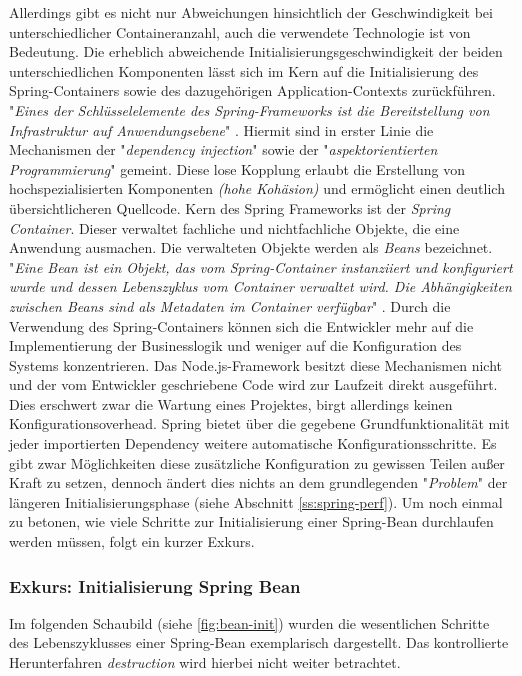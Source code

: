 Allerdings gibt es nicht nur Abweichungen hinsichtlich der Geschwindigkeit bei unterschiedlicher Containeranzahl, auch die verwendete Technologie ist von Bedeutung. Die erheblich abweichende Initialisierungsgeschwindigkeit der beiden unterschiedlichen Komponenten lässt sich im Kern auf die Initialisierung des Spring-Containers sowie des dazugehörigen Application-Contexts zurückführen. "\emph{Eines der Schlüsselelemente des Spring-Frameworks ist die Bereitstellung von Infrastruktur auf Anwendungsebene}" \cite[Seite~53 ff.]{simons-spring}. Hiermit sind in erster Linie die Mechanismen der "\emph{dependency injection}" sowie der "\emph{aspektorientierten Programmierung}" gemeint. Diese lose Kopplung erlaubt die Erstellung von hochspezialisierten Komponenten \emph{(hohe Kohäsion)} und ermöglicht einen deutlich übersichtlicheren Quellcode. Kern des Spring Frameworks ist der \emph{Spring Container}. Dieser verwaltet fachliche und nichtfachliche Objekte, die eine Anwendung ausmachen. Die verwalteten Objekte werden als \emph{Beans} bezeichnet. "\emph{Eine Bean ist ein Objekt, das vom Spring-Container instanziiert und konfiguriert wurde und dessen Lebenszyklus vom Container verwaltet wird. Die Abhängigkeiten zwischen Beans sind als Metadaten im Container verfügbar}" \cite[Kapitel~3.1.1]{simons-spring}. Durch die Verwendung des Spring-Containers können sich die Entwickler mehr auf die Implementierung der Businesslogik und weniger auf die Konfiguration des Systems konzentrieren. Das Node.js-Framework besitzt diese Mechanismen nicht und der vom Entwickler geschriebene Code wird zur Laufzeit direkt ausgeführt. Dies erschwert zwar die Wartung eines Projektes, birgt allerdings keinen Konfigurationsoverhead. Spring bietet über die gegebene Grundfunktionalität mit jeder importierten Dependency weitere automatische Konfigurationsschritte. Es gibt zwar Möglichkeiten diese zusätzliche Konfiguration zu gewissen Teilen außer Kraft zu setzen, dennoch ändert dies nichts an dem grundlegenden "\emph{Problem}" der längeren Initialisierungsphase (siehe Abschnitt \ref{ss:spring-perf}). Um noch einmal zu betonen, wie viele Schritte zur Initialisierung einer Spring-Bean durchlaufen werden müssen, folgt ein kurzer Exkurs.

\subsubsection{Exkurs: Initialisierung Spring Bean}
Im folgenden Schaubild (siehe \ref{fig:bean-init}) wurden die wesentlichen Schritte des Lebenszyklusses einer Spring-Bean exemplarisch dargestellt. Das kontrollierte Herunterfahren \emph{destruction} wird hierbei nicht weiter betrachtet. 

